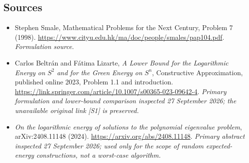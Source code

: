 \documentclass[11pt]{article}
\begin{document}
\subsection{Sources}
\begin{itemize}
\item[S1]Stephen Smale, Mathematical Problems for the Next Century, Problem 7 (1998).
\url{https://www.cityu.edu.hk/ma/doc/people/smales/pap104.pdf}.
\textit{Formulation source.}
\item[E1]Carlos Beltr\'an and F\'atima Lizarte,
\emph{A Lower Bound for the Logarithmic Energy on $S^2$ and for the Green
Energy on $S^n$}, Constructive Approximation, published online 2023,
Problem 1.1 and introduction.
\url{https://link.springer.com/article/10.1007/s00365-023-09642-4}.
\textit{Primary formulation and lower-bound comparison inspected
27 September 2026; the unavailable original link [S1] is preserved.}
\item[E2]\emph{On the logarithmic energy of solutions to the polynomial
eigenvalue problem}, arXiv:2408.11148 (2024).
\url{https://arxiv.org/abs/2408.11148}.
\textit{Primary abstract inspected 27 September 2026; used only for the
scope of random expected-energy constructions, not a worst-case algorithm.}

\end{itemize}
\end{document}
